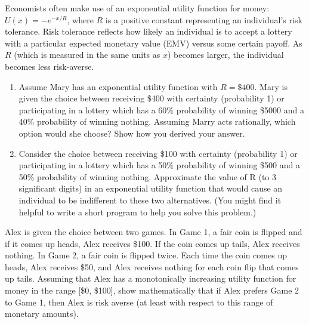 \begin{iexercise}
Economists often make use of an
exponential utility function for money: \(U(x) = -e^{-x/R}\), where \(R\) is
a positive constant representing an individual's risk tolerance.  
Risk tolerance reflects how likely an individual is to accept a
lottery with a particular expected monetary value (EMV) versus some
certain payoff.  As \(R\) (which is measured in the same units as \(x\))
becomes larger, the individual becomes less risk-averse.
\begin{enumerate}
\item Assume Mary has an exponential utility function with \(R = \$400\).  Mary
is given the choice between receiving \$400 with certainty (probability
1) or participating in a lottery which has a 60\% probability of
winning \$5000 and a 40\% probability of winning nothing.  Assuming
Marry acts rationally, which option would she choose?  Show how you
derived your answer.

\item Consider the choice between receiving \$100 with certainty
(probability 1) or participating in a lottery which has a 50\%
probability of winning \$500 and a 50\% probability of winning nothing.
Approximate the value of R (to 3 significant digits) in an exponential
utility function that would cause an individual to be indifferent to
these two alternatives.  (You might find it helpful to write a short
program to help you solve this problem.)
\end{enumerate}
\end{iexercise} 



\begin{iexercise}
Alex is given the choice between two games.  In Game 1, a fair coin
is flipped and if it comes up heads, Alex receives \$100.  If the coin
comes up tails, Alex receives nothing.  In Game 2, a fair coin is
flipped twice.  Each time the coin comes up heads, Alex receives \$50,
and Alex receives nothing for each coin flip that comes up tails.
Assuming that Alex has a monotonically increasing utility function for
money in the range [\$0, \$100], show mathematically that if Alex
prefers Game 2 to Game 1, then Alex is risk averse
(at least with respect to this range of monetary amounts).
\end{iexercise} 



